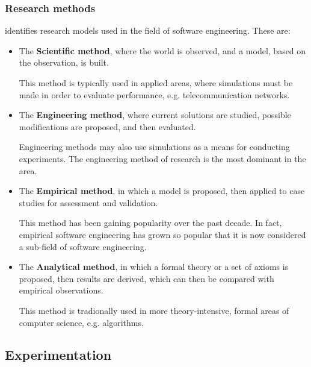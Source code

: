 \documentclass[a4paper]{article}
\begin{document}
            \subsubsection{Research methods}

                \cite{glass1994software} identifies research models used in the field of software engineering. These are:
                \begin{itemize}
                    \item The \textbf{Scientific method}, where the world is observed, and a model, based on the observation, is built.
                    
                    This method is typically used in applied areas, where simulations must be made in order to evaluate performance, e.g. telecommunication networks\supercite{wohlin2012experimentation}. 
                    \item The \textbf{Engineering method}, where current solutions are studied, possible modifications are proposed, and then evaluated.
                    
                    Engineering methods may also use simulations as a means for conducting experiments. The engineering method of research is the most dominant in the area. 
                    \item The \hypertarget{empiricalmethod}{\textbf{Empirical method}}, in which a model is proposed, then applied to case studies for assessment and validation.
                    
                    This method has been gaining popularity over the past decade. In fact, empirical software engineering has grown so popular that it is now considered a sub-field of software engineering. 
                    \item The \textbf{Analytical method}, in which a formal theory or a set of axioms is proposed, then results are derived, which can then be compared with empirical observations.
                    
                    This method is tradionally used in more theory-intensive, formal areas of computer science, e.g. algorithms\supercite{wohlin2012experimentation}.
                    
                \end{itemize}


        \subsection{Experimentation}
\end{document}

